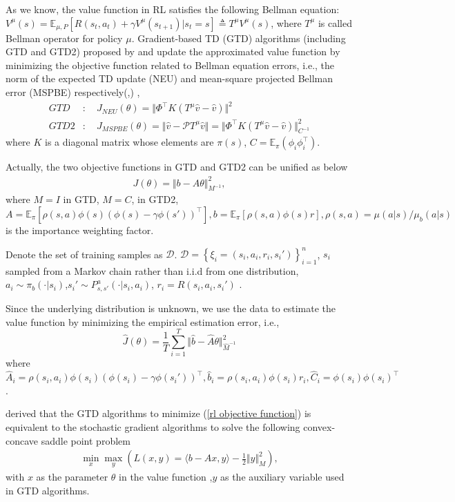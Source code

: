 \documentclass[twoside,11pt]{article}
\numberwithin{equation}{section}
\newcommand{\E}{\mathbb{E}}
\begin{document}
		As we know, the value function in RL satisfies the following Bellman equation: $ V^\mu(s)   = \E_{\mu,P}\left[R(s_t,a_t)+\gamma V^\mu(s_{t+1}) | s_t=s \right] \triangleq T^\mu V^\mu(s)  $,
		where $ T^\mu  $ is called Bellman operator for policy $\mu$.
		Gradient-based TD (GTD) algorithms (including GTD and GTD2) proposed by \cite{sutton2009convergent} and \cite{sutton2009fast}  update the approximated value function by minimizing the objective function related to  Bellman equation errors, i.e., the  norm of the expected TD update (NEU) and mean-square projected Bellman error  (MSPBE) respectively(\cite{maei2011gradient},\cite{liu2015finite})	,
		\begin{align}
		GTD&:  \quad J_{NEU}(\theta)  =\Vert \Phi^\top K (T^\mu\hat{v}-\hat{v}) \Vert^2\\
		GTD2&: \quad J_{MSPBE}(\theta)  = \Vert \hat{v} - \mathcal{P} T^\mu\hat{v}\Vert = \Vert \Phi^\top K (T^\mu\hat{v}-\hat{v}) \Vert^2_{C^{-1}}
		\end{align}
		where $ K $ is a   diagonal matrix whose elements are $ \pi(s) $, $ C  = \E_\pi(\phi_i\phi_i^\top ) $.
		
		Actually, the two objective functions in GTD and GTD2 can be unified as below 
		\begin{align}\label{rl objective function}
		J(\theta) =  \Vert b-A\theta \Vert_{M^{-1}}^2,
		\end{align} 	
		where $M=I$ in GTD, $ M = C$, in GTD2,  $  A=\E_\pi[\rho(s,a)  \phi(s)(\phi(s)-\gamma\phi(s'))^\top] ,  b=\E_\pi[\rho(s,a) \phi(s) r] , \rho(s,a) = \mu(a |s ) / \mu_b(a |s )$ is  the importance weighting factor. 
		
		Denote the set of training samples as $ \mathcal{D} $. $ \mathcal{D} = \left \lbrace \xi_i= (s_i,a_i,r_i,s_i') \right\rbrace_{i=1}^n $, $ s_i$ sampled from a Markov chain rather than i.i.d from one distribution, $ a_i \sim \pi_b(\cdot|s_i)$,$ s_i' \sim P_{s,s'}^a(\cdot \vert s_i,a_i) $, $ r_i = R(s_i,a_i,s_i') $ . 
		
		Since the underlying distribution is unknown, we use the data  to estimate the value function by minimizing the empirical estimation error, i.e., 
		 $$ \hat{J}(\theta) =  \frac{1}{T}\sum_{i=1}^T\Vert \hat{b}-\hat{A}\theta \Vert_{\hat{M}^{-1}}^2$$    
		where $ \hat{A}_i= \rho(s_i,a_i) \phi(s_i)(\phi(s_i)-\gamma\phi(s_i'))^\top  ,  \hat{b}_i= \rho(s_i,a_i)\phi(s_i) r_i , \hat{C}_i = \phi(s_i)\phi(s_i) ^\top $.		
		
		\cite{liu2015finite} derived that the GTD algorithms to minimize     (\ref{rl objective function}) is equivalent to the stochastic gradient algorithms to solve the following convex-concave saddle point problem
		  \begin{align}\label{gtd minmax form}
		\min_x\max_y\left( L(x,y) = \langle b-Ax,y \rangle - \frac{1}{2}\Vert y\Vert^2_M \right),
		\end{align} 
		with $ x $ as the  parameter $ \theta $ in the value function  ,$ y $ as the auxiliary variable used in GTD algorithms.
	
\end{document}
